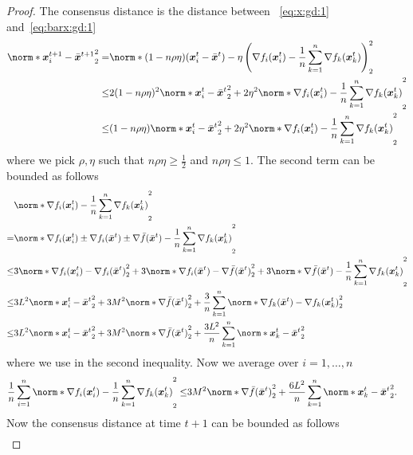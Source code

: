 \documentclass{article}
\begin{document}
\begin{proof}
  The consensus distance is the distance between ~\eqref{eq:x:gd:1} and~\eqref{eq:barx:gd:1}
  \begin{align*}
    \norm*{\xx_i^{t+1} - \bar{\xx}^{t+1}}_2^2
    =& \norm*{(1-n\rho\eta)(\xx_i^{t} - \bar{\xx}^{t})-\eta\left(\nabla f_i(\xx_i^t) - \frac{1}{n}\sum_{k=1}^n\nabla f_k(\xx_k^t)\right) }_2^2 \\
    \le&2(1-n\rho\eta)^2 \norm*{\xx_i^{t} - \bar{\xx}^{t}}_2^2
    + 2\eta^2\norm*{\nabla f_i(\xx_i^t) - \frac{1}{n}\sum_{k=1}^n\nabla f_k(\xx_k^t)}_2^2 \\
    \le&(1-n\rho\eta) \norm*{\xx_i^{t} - \bar{\xx}^{t}}_2^2
    + 2\eta^2\norm*{\nabla f_i(\xx_i^t) - \frac{1}{n}\sum_{k=1}^n\nabla f_k(\xx_k^t)}_2^2
  \end{align*}
  where we pick $\rho,\eta$ such that $n\rho\eta \ge \frac{1}{2}$ and $n\rho\eta\le 1$. The second term can be bounded as follows 
  \begin{align*}
    &\norm*{\nabla f_i(\xx_i^t) - \frac{1}{n}\sum_{k=1}^n\nabla f_k(\xx_k^t)}_2^2\\
    =& \norm*{\nabla f_i(\xx_i^t) \pm \nabla f_i(\bar{\xx}^t) \pm \nabla \bar{f}(\bar{\xx}^t) - \frac{1}{n}\sum_{k=1}^n\nabla f_k(\xx_k^t)}_2^2 \\
    \le& 3 \norm*{\nabla f_i(\xx_i^t) - \nabla f_i(\bar{\xx}^t)}_2^2 + 3 \norm*{\nabla f_i(\bar{\xx}^t) - \nabla \bar{f}(\bar{\xx}^t)}_2^2 + 3 \norm*{\nabla \bar{f}(\bar{\xx}^t) - \frac{1}{n}\sum_{k=1}^n\nabla f_k(\xx_k^t)}_2^2 \\
    \le& 3 L^2 \norm*{\xx_i^t - \bar{\xx}^t}_2^2 + 3 M^2 \norm*{ \nabla \bar{f}(\bar{\xx}^t) }_2^2 + \frac{3}{n} \sum_{k=1}^n \norm*{\nabla f_k(\bar{\xx}^t) - \nabla f_k(\xx_k^t)}_2^2 \\
    \le& 3 L^2 \norm*{\xx_i^t - \bar{\xx}^t}_2^2 + 3 M^2 \norm*{ \nabla \bar{f}(\bar{\xx}^t) }_2^2 + \frac{3L^2}{n} \sum_{k=1}^n \norm*{\xx_k^t - \bar{\xx}^t}_2^2
  \end{align*}
  where we use  in the second inequality. Now we average over $i=1,\ldots,n$
  \begin{align*}
    \frac{1}{n}\sum_{i=1}^n\norm*{\nabla f_i(\xx_i^t) - \frac{1}{n}\sum_{k=1}^n\nabla f_k(\xx_k^t)}_2^2
    \le&  3 M^2 \norm*{ \nabla \bar{f}(\bar{\xx}^t) }_2^2 + \frac{6L^2}{n} \sum_{k=1}^n \norm*{\xx_k^t - \bar{\xx}^t}_2^2.
  \end{align*}
  Now the consensus distance at time $t+1$ can be bounded as follows
  \begin{align*}

\end{align*}
\end{proof}
\end{document}
